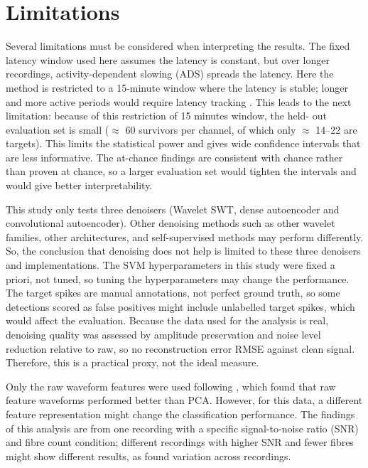 \documentclass[ %
                    author={Rzan Alkabier},
                    supervisor={Dr. Zahraa Abdallah},
                    degree={MSc},
                     title={Denoising Extracellular Recording for Spike Detection and Classification on Single Channels},
                    subtitle={Does denoising improve detection and classification performance?},
                      type={},
                      year={2026}]{dissertation}
\begin{document}

\section{Limitations}
Several limitations must be considered when interpreting the results. The fixed latency window used here assumes the latency is constant, but over longer recordings, activity-dependent slowing (ADS) spreads the latency. Here the method is restricted to a 15-minute window where the latency is stable; longer and more active periods would require latency tracking \cite{troglio_hybrid_2026}. This leads to the next limitation: because of this restriction of 15 minutes window, the held- out evaluation set is small ($\approx$ 60 survivors per channel, of which only $\approx$ 14--22 are targets). This limits the statistical power and gives wide confidence intervals that are less informative. The at-chance findings are consistent with chance rather than proven at chance, so a larger evaluation set would tighten the intervals and would give better interpretability. 
\bigskip

\noindent
This study only tests three denoisers (Wavelet SWT, dense autoencoder and convolutional autoencoder). Other denoising methods such as other wavelet families, other architectures, and self-supervised methods may perform differently. So, the conclusion that denoising does not help is limited to these three denoisers and implementations. 
The SVM hyperparameters in this study were fixed a priori, not tuned, so tuning the hyperparameters may change the performance. 
The target spikes are manual annotations, not perfect ground truth, so some detections scored as false positives might include unlabelled target spikes, which would affect the evaluation. 
Because the data used for the analysis is real, denoising quality was assessed by amplitude preservation and noise level reduction relative to raw, so no reconstruction error RMSE against clean signal. Therefore, this is a practical proxy, not the ideal measure. 
\bigskip

\noindent
Only the raw waveform features were used following \cite{troglio_hybrid_2026}, which found that raw feature waveforms performed better than PCA. However, for this data, a different feature representation might change the classification performance. The findings of this analysis are from one recording with a specific signal-to-noise ratio (SNR) and fibre count condition; different recordings with higher SNR and fewer fibres might show different results, as \cite{troglio_hybrid_2026} found variation across recordings. 
\bigskip
\end{document}
